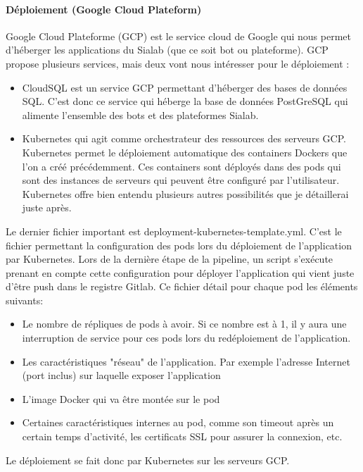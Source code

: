 \documentclass{article} %
\begin{document}
{\paragraph{Déploiement (Google Cloud Plateform)\\}

Google Cloud Plateforme (GCP) est le service cloud de Google qui nous permet d'héberger les applications du Sialab (que ce soit bot ou plateforme). GCP propose plusieurs services, mais deux vont nous intéresser pour le déploiement : 
\begin{itemize}
 \item CloudSQL est un service GCP permettant d'héberger des bases de données SQL. C'est donc ce service qui héberge la base de données PostGreSQL qui alimente l'ensemble des bots et des plateformes Sialab.
 \item Kubernetes qui agit comme orchestrateur des ressources des serveurs GCP. Kubernetes permet le déploiement automatique des containers Dockers que l'on a créé précédemment. Ces containers sont déployés dans des pods qui sont des instances de serveurs qui peuvent être configuré par l'utilisateur. Kubernetes offre bien entendu plusieurs autres possibilités que je détaillerai juste après. 
\end{itemize}

Le dernier fichier important est deployment-kubernetes-template.yml. C'est le fichier permettant la configuration des pods lors du déploiement de l'application par Kubernetes. Lors de la dernière étape de la pipeline, un script s'exécute prenant en compte cette configuration pour déployer l'application qui vient juste d'être push dans le registre Gitlab. Ce fichier détail pour chaque pod les éléments suivants:
\begin{itemize}
 \item Le nombre de répliques de pods à avoir. Si ce nombre est à 1, il y aura une interruption de service pour ces pods lors du redéploiement de l'application.
 \item Les caractéristiques "réseau" de l'application. Par exemple l'adresse Internet (port inclus) sur laquelle exposer l'application
 \item L'image Docker qui va être montée sur le pod
 \item Certaines caractéristiques internes au pod, comme son timeout après un certain temps d'activité, les certificats SSL pour assurer la connexion, etc.
\end{itemize}

Le déploiement se fait donc par Kubernetes sur les serveurs GCP.\\

}
\end{document}
